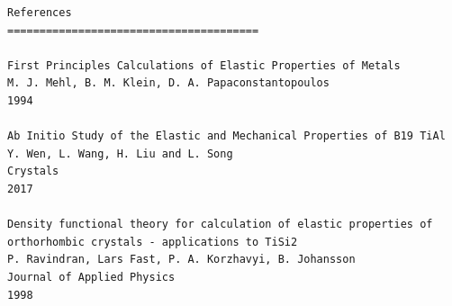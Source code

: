 \documentclass[12pt,twoside]{manual}
\begin{document}
\begin{appendices}
\begin{lstlisting}[style=inputfile,caption={Results File}]
References 
=======================================

First Principles Calculations of Elastic Properties of Metals
M. J. Mehl, B. M. Klein, D. A. Papaconstantopoulos
1994

Ab Initio Study of the Elastic and Mechanical Properties of B19 TiAl
Y. Wen, L. Wang, H. Liu and L. Song
Crystals
2017

Density functional theory for calculation of elastic properties of orthorhombic crystals - applications to TiSi2
P. Ravindran, Lars Fast, P. A. Korzhavyi, B. Johansson
Journal of Applied Physics
1998
\end{lstlisting}



\end{appendices}







\printbibliography
\end{document}
